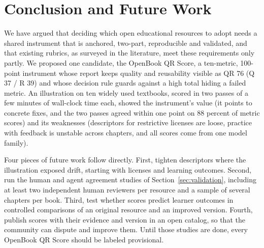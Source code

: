 \section{Conclusion and Future Work}
\label{sec:conclusion}

We have argued that deciding which open educational resources to adopt needs a shared instrument that is anchored, two-part, reproducible and validated, and that existing rubrics, as surveyed in the literature, meet these requirements only partly. We proposed one candidate, the OpenBook QR Score, a ten-metric, 100-point instrument whose report keeps quality and reusability visible as QR 76 (Q 37 / R 39) and whose decision rule guards against a high total hiding a failed metric. An illustration on ten widely used textbooks, scored in two passes of a few minutes of wall-clock time each, showed the instrument's value (it points to concrete fixes, and the two passes agreed within one point on 88 percent of metric scores) and its weaknesses (descriptors for restrictive licenses are loose, practice with feedback is unstable across chapters, and all scores come from one model family).

Four pieces of future work follow directly. First, tighten descriptors where the illustration exposed drift, starting with licenses and learning outcomes. Second, run the human and agent agreement studies of Section~\ref{sec:validation}, including at least two independent human reviewers per resource and a sample of several chapters per book. Third, test whether scores predict learner outcomes in controlled comparisons of an original resource and an improved version. Fourth, publish scores with their evidence and version in an open catalog, so that the community can dispute and improve them. Until those studies are done, every OpenBook QR Score should be labeled provisional.
